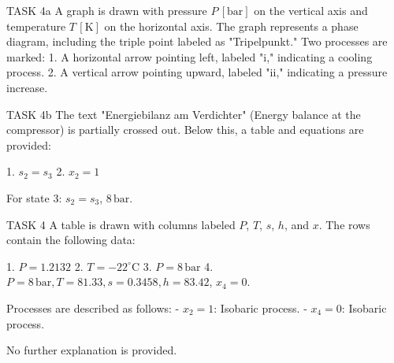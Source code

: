 TASK 4a  
A graph is drawn with pressure \( P \, [\text{bar}] \) on the vertical axis and temperature \( T \, [\text{K}] \) on the horizontal axis. The graph represents a phase diagram, including the triple point labeled as "Tripelpunkt." Two processes are marked:  
1. A horizontal arrow pointing left, labeled "i," indicating a cooling process.  
2. A vertical arrow pointing upward, labeled "ii," indicating a pressure increase.  

TASK 4b  
The text "Energiebilanz am Verdichter" (Energy balance at the compressor) is partially crossed out. Below this, a table and equations are provided:  

1. \( s_2 = s_3 \)  
2. \( x_2 = 1 \)  

For state 3:  
\( s_2 = s_3 \), \( 8 \, \text{bar} \).  

TASK 4  
A table is drawn with columns labeled \( P \), \( T \), \( s \), \( h \), and \( x \). The rows contain the following data:  

1. \( P = 1.2132 \)  
2. \( T = -22^\circ\text{C} \)  
3. \( P = 8 \, \text{bar} \)  
4. \( P = 8 \, \text{bar}, T = 81.33, s = 0.3458, h = 83.42 \), \( x_4 = 0 \).  

Processes are described as follows:  
- \( x_2 = 1 \): Isobaric process.  
- \( x_4 = 0 \): Isobaric process.  

No further explanation is provided.